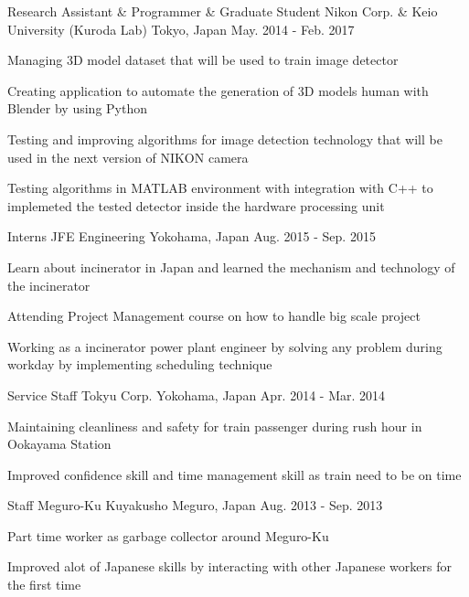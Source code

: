 \begin{cventries}
  \cventry
	{Research Assistant \& Programmer \& Graduate Student} %
	{Nikon Corp. \& Keio University (Kuroda Lab)} %
    {Tokyo, Japan} %
    {May. 2014 - Feb. 2017} %
    {
      \begin{cvitems} %
        \item {Managing 3D model dataset that will be used to train image detector}
        \item {Creating application to automate the generation of 3D models human with Blender by using Python}
        \item {Testing and improving algorithms for image detection technology that will be used in the next version of NIKON camera}
        \item {Testing algorithms in MATLAB environment with integration with C++ to implemeted the tested detector inside the hardware processing unit}
      \end{cvitems}
    }

  \cventry
    {Interns} %
    {JFE Engineering} %
    {Yokohama, Japan} %
    {Aug. 2015 - Sep. 2015} %
    {
      \begin{cvitems} %
        \item {Learn about incinerator in Japan and learned the mechanism and technology of the incinerator}
        \item {Attending Project Management course on how to handle big scale project}
        \item {Working as a incinerator power plant engineer by solving any problem during workday by implementing scheduling technique }
      \end{cvitems}
    }

  \cventry
    {Service Staff} %
    {Tokyu Corp.} %
    {Yokohama, Japan} %
    {Apr. 2014 - Mar. 2014} %
    {
      \begin{cvitems} %
        \item {Maintaining cleanliness and safety for train passenger during rush hour in Ookayama Station}
        \item {Improved confidence skill and time management skill as train need to be on time }
      \end{cvitems}
    }

  \cventry
    {Staff} %
    {Meguro-Ku Kuyakusho} %
    {Meguro, Japan} %
    {Aug. 2013 - Sep. 2013} %
    {
      \begin{cvitems} %
        \item {Part time worker as garbage collector around Meguro-Ku}
        \item {Improved alot of Japanese skills by interacting with other Japanese workers for the first time}
      \end{cvitems}
    }
\end{cventries}
